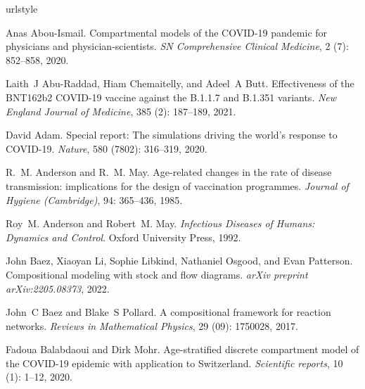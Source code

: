 \documentclass{article}
\theoremstyle{definition}
\begin{document}
%
%
\begin{thebibliography}{37}
\providecommand{\natexlab}[1]{#1}
\providecommand{\url}[1]{\texttt{#1}}
\expandafter\ifx\csname urlstyle\endcsname\relax
  \providecommand{\doi}[1]{doi: #1}\else
  \providecommand{\doi}{doi: \begingroup \urlstyle{rm}\Url}\fi

Anas Abou-Ismail.
\newblock Compartmental models of the {COVID-19} pandemic for physicians and
  physician-scientists.
\newblock \emph{SN Comprehensive Clinical Medicine}, 2 (7):
  852--858, 2020.

Laith~J Abu-Raddad, Hiam Chemaitelly, and Adeel~A Butt.
\newblock Effectiveness of the {BNT162b2} {COVID-19} vaccine against the
  {B.1.1.7 }and {B.1.351} variants.
\newblock \emph{New England Journal of Medicine}, 385 (2):
  187--189, 2021.

David Adam.
\newblock Special report: The simulations driving the world's response to
  {COVID-19}.
\newblock \emph{Nature}, 580 (7802): 316--319, 2020.

R.~M. Anderson and R.~M. May.
\newblock Age-related changes in the rate of disease transmission: implications
  for the design of vaccination programmes.
\newblock \emph{Journal of Hygiene (Cambridge)}, 94: 365--436, 1985.

Roy~M. Anderson and Robert~M. May.
\newblock \emph{Infectious Diseases of Humans: Dynamics and Control}.
\newblock Oxford University Press, 1992.

John Baez, Xiaoyan Li, Sophie Libkind, Nathaniel Osgood, and Evan Patterson.
\newblock Compositional modeling with stock and flow diagrams.
\newblock \emph{arXiv preprint arXiv:2205.08373}, 2022.

John~C Baez and Blake~S Pollard.
\newblock A compositional framework for reaction networks.
\newblock \emph{Reviews in Mathematical Physics}, 29 (09):
  1750028, 2017.

Fadoua Balabdaoui and Dirk Mohr.
\newblock Age-stratified discrete compartment model of the {COVID-19} epidemic
  with application to {Switzerland}.
\newblock \emph{Scientific reports}, 10 (1): 1--12, 2020.


\end{thebibliography}
\end{document}
